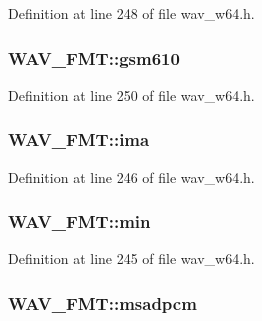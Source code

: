 Definition at line 248 of file wav\+\_\+w64.\+h.

\subsubsection[{\texorpdfstring{gsm610}{gsm610}}]{ W\+A\+V\+\_\+\+F\+M\+T\+::gsm610}\hypertarget{union_w_a_v___f_m_t_a5adbfda640c2d09950caa8420be042c8}{}\label{union_w_a_v___f_m_t_a5adbfda640c2d09950caa8420be042c8}


Definition at line 250 of file wav\+\_\+w64.\+h.

\subsubsection[{\texorpdfstring{ima}{ima}}]{ W\+A\+V\+\_\+\+F\+M\+T\+::ima}\hypertarget{union_w_a_v___f_m_t_af94d3e9c25dc75934173418ece655cdc}{}\label{union_w_a_v___f_m_t_af94d3e9c25dc75934173418ece655cdc}


Definition at line 246 of file wav\+\_\+w64.\+h.

\subsubsection[{\texorpdfstring{min}{min}}]{ W\+A\+V\+\_\+\+F\+M\+T\+::min}\hypertarget{union_w_a_v___f_m_t_afb3e6dd7d43c929d9740e40d947abffe}{}\label{union_w_a_v___f_m_t_afb3e6dd7d43c929d9740e40d947abffe}


Definition at line 245 of file wav\+\_\+w64.\+h.

\subsubsection[{\texorpdfstring{msadpcm}{msadpcm}}]{ W\+A\+V\+\_\+\+F\+M\+T\+::msadpcm}\hypertarget{union_w_a_v___f_m_t_a819de45b8d1ffe8f331d0f86f0a87798}{}\label{union_w_a_v___f_m_t_a819de45b8d1ffe8f331d0f86f0a87798}


